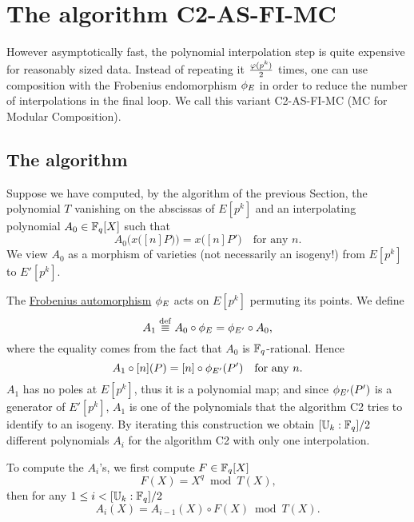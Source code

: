 \section{The algorithm C2-AS-FI-MC}
\label{sec:C2-AS-FI-MC}

However asymptotically fast, the polynomial interpolation step is
quite expensive for reasonably sized data. Instead of repeating it
$\frac{\varphi(p^k)}{2}$ times, one can use composition with the
Frobenius endomorphism $\phi_E$ in order to reduce the number of
interpolations in the final loop. We call this variant C2-AS-FI-MC (MC
for Modular Composition).

\subsection{The algorithm}
Suppose we have computed, by the algorithm of the previous Section,
the polynomial $T$ vanishing on the abscissas of $E[p^k]$ and an
interpolating polynomial $A_0\in\mathbb{F}_q[X]$ such that
\begin{equation*}
  A_0\bigl(x\bigl([n]P\bigr)\bigr) = x\bigl([n]P'\bigr)
  \quad\text{for any $n$.}
\end{equation*}
We view $A_0$ as a morphism of varieties (not necessarily an isogeny!)
from $E[p^k]$ to $E'[p^k]$.

The \hyperref[sec:curves-over-finite]{Frobenius automorphism}
$\phi_E$ acts on $E[p^k]$ permuting its points. We define
\begin{equation}
  \label{eq:183}
  A_1\overset{\mathrm{def}}{\equiv} A_0\circ\phi_E = \phi_{E'}\circ A_0
  \text{,}
\end{equation}
where the equality comes from the fact that $A_0$ is
$\mathbb{F}_q$-rational. Hence
\begin{equation*}
  A_1\circ[n](P) = [n]\circ\phi_{E'}(P')
  \quad\text{for any $n$.}
\end{equation*}
$A_1$ has no poles at $E[p^k]$, thus it is a polynomial map; and since
$\phi_{E'}(P')$ is a generator of $E'[p^k]$, $A_1$ is one of the
polynomials that the algorithm C2 tries to identify to an isogeny. By
iterating this construction we obtain $[\mathbb{U}_k:\mathbb{F}_q]/2$ different
polynomials $A_i$ for the algorithm C2 with only one interpolation.

To compute the $A_i$'s, we first compute $F\in\mathbb{F}_q[X]$
\begin{equation}
  \label{eq:frob}
  F(X) = X^q \bmod T(X)
  \text{,}
\end{equation}
then for any $1\le i<[\mathbb{U}_k:\mathbb{F}_q]/2$
\begin{equation}
  \label{eq:modcomp}
  A_i(X) = A_{i-1}(X)\circ F(X) \bmod T(X)\text{.}
\end{equation}

